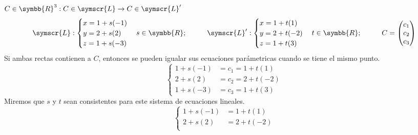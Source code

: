 \documentclass{article}
\def\fancyL{\symscr{L}}
\def\realR{\symbb{R}}
\begin{document}
\begin{enumerate}
\begin{itemize}
\begin{enumerate}[label=\listAlph]
\begin{mathcase}{\(C \in \realR^3: C \in \fancyL \rightarrow C \in \fancyL'\)}
\[                                \fancyL:
                                \begin{cases}
                                    x = 1 + s(-1) \\
                                    y = 2 + s(2) \\
                                    z = 1 + s(-3) 
                                \end{cases}
                                s \in \realR;
                                \hspace{1cm}
                                \fancyL': 
                                \begin{cases}
                                    x = 1 + t(1) \\
                                    y = 2 + t(-2) \\
                                    z = 1 + t(3)
                                \end{cases}
                                t \in \realR;
                                \hspace{1cm}
                                C = \begin{pmatrix}c_1 \\ c_2 \\ c_3\end{pmatrix}
                            \]
                            Si ambas rectas contienen a \(C\), entonces se pueden igualar sus ecuaciones parámetricas cuando se tiene el mismo punto.
                            \[
                                \left\{
                                \begin{aligned}
                                    1 + s(-1) &= c_1 = 1 + t(1) \\
                                    2 + s(2) &= c_2 = 2 + t(-2) \\
                                    1 + s(-3) &= c_3 = 1 + t(3)
                                \end{aligned}
                                \right.
                            \]
                            Miremos que \(s\) y \(t\) sean consistentes para este sistema de ecuaciones lineales.
                            \[
                                \left\{
                                \begin{aligned}
                                    1 + s(-1) &= 1 + t(1) \\
                                    2 + s(2) &= 2 + t(-2) \\

\end{aligned}\]
\end{mathcase}
\end{enumerate}
\end{itemize}
\end{enumerate}
\end{document}
